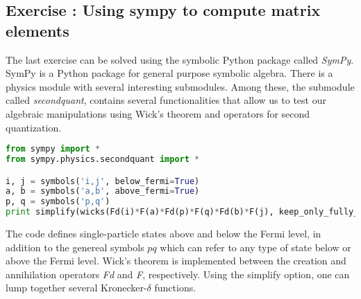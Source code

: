 \documentclass[graybox,sectrefs,envcountresetchap,open=right]{svmonodo}
\newenvironment{doconceexercise}{}{}
\newcounter{doconceexercisecounter}
\begin{document}
\begin{doconceexercise}

\subsection*{Exercise \thedoconceexercisecounter: Using sympy to compute matrix elements}


The last exercise can be solved using the symbolic Python package called \emph{SymPy}. SymPy is a Python 
package for general purpose symbolic algebra. There is a physics module with several interesting submodules.
Among these, the submodule called \emph{secondquant}, contains several  functionalities that allow us to test
our algebraic manipulations using Wick's theorem and operators for second quantization.
\begin{lstlisting}[language=Python,style=blue1bar]
from sympy import *
from sympy.physics.secondquant import *

i, j = symbols('i,j', below_fermi=True)
a, b = symbols('a,b', above_fermi=True)
p, q = symbols('p,q')
print simplify(wicks(Fd(i)*F(a)*Fd(p)*F(q)*Fd(b)*F(j), keep_only_fully_contracted=True))
\end{lstlisting}
The code defines single-particle states above and below the Fermi level, in addition to the genereal symbols
$pq$ which can refer to any type of state below or above the Fermi level. Wick's theorem is implemented between 
the creation and annihilation operators \emph{Fd} and \emph{F}, respectively. Using the simplify option, one can lump together several Kronecker-$\delta$ functions.

\end{doconceexercise}
\end{document}
